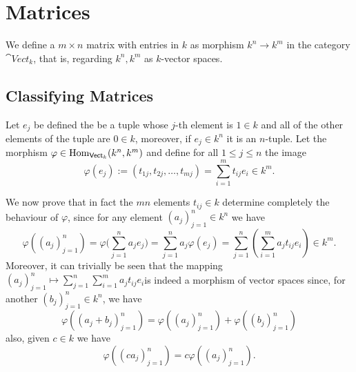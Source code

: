 \section{Matrices}

\begin{definition}[Matrix]
   We define a \(m \times n\) matrix with entries in \(k\) as morphism \(k^n \to
   k^m\) in the category \(\cat{Vect}_k\), that is, regarding \(k^n, k^m\) as
   \(k\)-vector spaces.
\end{definition}

\subsection{Classifying Matrices}

Let \(e_j\) be defined the be a tuple whose \(j\)-th element is \(1 \in k\) and
all of the other elements of the tuple are \(0 \in k\), moreover, if \(e_j \in
k^n\) it is an \(n\)-tuple. Let the morphism \(\varphi \in \operatorname{Hom}_{\mathsf{Vect}_k}
(k^n, k^m)\) and define for all \(1 \leq j \leq n\) the image
\[
   \varphi(e_j) := (t_{1 j}, t_{2 j}, \dots, t_{mj}) = \sum_{i = 1}^m t_{ij} e_i
   \in k^m.
\] 

We now prove that in fact the \(mn\) elements \(t_{ij} \in k\) determine
completely the behaviour of \(\varphi\), since for any element \((a_j)_{j=1}^n
\in k^n\) we have 
\[
   \varphi((a_j)_{j=1}^n) = \varphi \Bigg( \sum_{j=1}^n a_j e_j \Bigg) =
   \sum_{j=1}^n a_j \varphi(e_j) = \sum_{j=1}^n \left( \sum_{i=1}^m a_j t_{i j}
   e_i\right) \in k^m.
\]
Moreover, it can trivially be seen that the mapping \((a_j)_{j=1}^n \mapsto
\sum_{j=1}^n \sum_{i=1}^m a_j t_{ij} e_i\)is indeed a morphism of vector
spaces since, for another \((b_j)_{j=1}^n \in k^n\), we have 
\[
   \varphi((a_j + b_j)_{j=1}^n) = \varphi((a_j)_{j=1}^n) +
   \varphi((b_j)_{j=1}^n)
\] 
also, given \(c \in k\) we have 
\[
   \varphi((c a_j)_{j=1}^n) = c\varphi((a_j)_{j=1}^n).
\]

